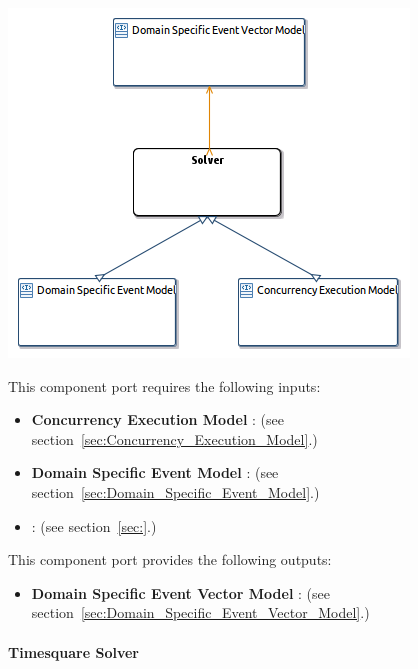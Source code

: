 \documentclass{gemoc} %
\begin{document}
\begin{center}
\includegraphics*[trim=0.0cm 0.0cm 0cm 0.0cm, clip=true]{../images/generated/Generated_Solver.png}
\end{center}

This component port requires the following inputs:
\begin{itemize}
  \item \textbf{Concurrency Execution Model} :
(see section~\ref{sec:Concurrency_Execution_Model}.)
  \item \textbf{Domain Specific Event Model} :
(see section~\ref{sec:Domain_Specific_Event_Model}.)
  \item \textbf{} :
(see section~\ref{sec:}.)
\end{itemize}

This component port provides the following outputs:
\begin{itemize}
  \item \textbf{Domain Specific Event Vector Model} :
(see section~\ref{sec:Domain_Specific_Event_Vector_Model}.)
\end{itemize}

\paragraph{Timesquare Solver}
\label{sec:Timesquare_Solver}
\end{document}
